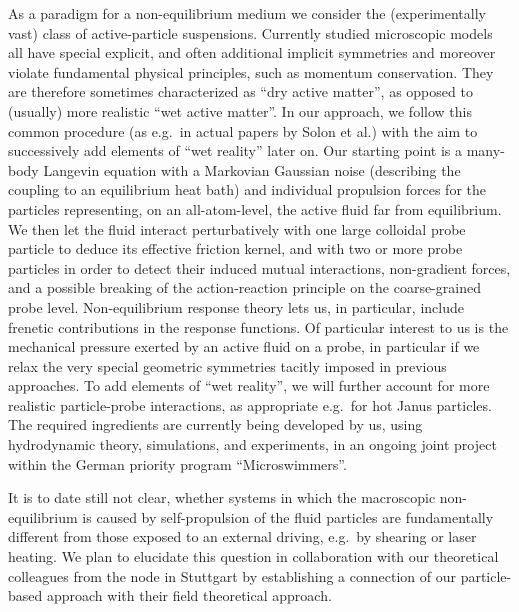 \begin{workpackage}[id=WP_active,wphases=0-48,
  short=Active Particle Suspensions,%
  title=Probing Active Particle Suspensions with Colloids and Polymers,
  lead=Leipzig,
  LeipzigRM=12]
\begin{tasklist}

  \begin{task}[title=Non-Equilibrium Equations of State (NEOS),id=task1,PM=15,lead=Leipzig,wphases=0-30!0.5]
    As a paradigm for a non-equilibrium medium we consider the (experimentally vast) class of active-particle suspensions. 
    Currently studied microscopic models all have special explicit, and often additional implicit symmetries and moreover violate fundamental physical principles, such as momentum conservation. 
    They are therefore sometimes characterized as ``dry active matter'', as opposed to (usually) more realistic ``wet active matter''.
    In our approach, we follow this common procedure (as e.g.\ in actual papers by Solon et al.) with the aim to successively add elements of ``wet reality'' later on. 
    Our starting point is a many-body Langevin equation with a Markovian Gaussian noise (describing the coupling to an equilibrium heat bath) and individual propulsion forces for the particles representing, on an all-atom-level, the active fluid far from equilibrium. 
    We then let the fluid interact perturbatively with one large colloidal probe particle to deduce its effective friction kernel, and with two or more probe particles in order to detect their induced mutual interactions, non-gradient forces, and a possible breaking of the action-reaction principle on the coarse-grained probe level.
    Non-equilibrium response theory lets us, in particular, include frenetic contributions in the response functions. 
    Of particular interest to us is the mechanical pressure exerted by an active fluid on a probe, in particular if we relax the very special geometric symmetries tacitly imposed in previous approaches. 
    To add elements of ``wet reality'', we will further account for more realistic particle-probe interactions, as appropriate e.g.\ for hot Janus particles. 
    The required ingredients are currently being developed by us, using hydrodynamic theory, simulations, and experiments, in an ongoing joint project within the German priority program ``Microswimmers''.     
     
It is to date still not clear, whether systems in which the macroscopic non-equilibrium is caused by self-propulsion of the fluid particles are fundamentally different from those exposed to an external driving, e.g.\ by shearing or laser heating. 
    We plan to elucidate this question in collaboration with our theoretical colleagues from the node in Stuttgart by establishing a connection of our particle-based approach with their field theoretical approach.


\end{task}
\end{tasklist}
\end{workpackage}
